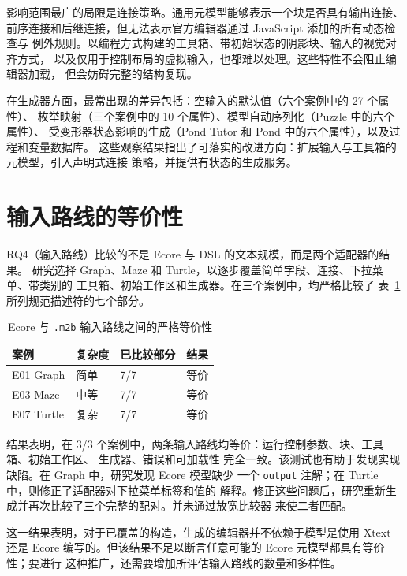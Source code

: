 影响范围最广的局限是连接策略。通用元模型能够表示一个块是否具有输出连接、
前序连接和后继连接，但无法表示官方编辑器通过 JavaScript 添加的所有动态检查与
例外规则。以编程方式构建的工具箱、带初始状态的阴影块、输入的视觉对齐方式，
以及仅用于控制布局的虚拟输入，也都难以处理。这些特性不会阻止编辑器加载，
但会妨碍完整的结构复现。

在生成器方面，最常出现的差异包括：空输入的默认值（六个案例中的 27 个属性）、
枚举映射（三个案例中的 10 个属性）、模型自动序列化（Puzzle 中的六个属性）、
受变形器状态影响的生成（Pond Tutor 和 Pond 中的六个属性），以及过程和变量数据库。
这些观察结果指出了可落实的改进方向：扩展输入与工具箱的元模型，引入声明式连接
策略，并提供有状态的生成服务。

\section{输入路线的等价性}
\label{sec:resultados-rutas-entrada}

RQ4（输入路线）比较的不是 Ecore 与 DSL 的文本规模，而是两个适配器的结果。
研究选择 Graph、Maze 和 Turtle，以逐步覆盖简单字段、连接、下拉菜单、带类别的
工具箱、初始工作区和生成器。在三个案例中，均严格比较了
表~\ref{tab:equivalencia-rutas} 所列规范描述符的七个部分。

\begin{table}[htbp]
  \centering
  \caption{Ecore 与 \texttt{.m2b} 输入路线之间的严格等价性}
  \label{tab:equivalencia-rutas}
  \begin{tabular}{llll}
    \toprule
    案例 & 复杂度 & 已比较部分 & 结果 \\
    \midrule
    E01 Graph  & 简单 & 7/7 & 等价 \\
    E03 Maze   & 中等 & 7/7 & 等价 \\
    E07 Turtle & 复杂 & 7/7 & 等价 \\
    \bottomrule
  \end{tabular}
\end{table}

结果表明，在 3/3 个案例中，两条输入路线均等价：运行控制参数、块、工具箱、初始工作区、
生成器、错误和可加载性
完全一致。该测试也有助于发现实现缺陷。在 Graph 中，研究发现 Ecore 模型缺少
一个 \texttt{output} 注解；在 Turtle 中，则修正了适配器对下拉菜单标签和值的
解释。修正这些问题后，研究重新生成并再次比较了三个完整的配对。并未通过放宽比较器
来使二者匹配。

这一结果表明，对于已覆盖的构造，生成的编辑器并不依赖于模型是使用 Xtext 还是
Ecore 编写的。但该结果不足以断言任意可能的 Ecore 元模型都具有等价性；要进行
这种推广，还需要增加所评估输入路线的数量和多样性。

